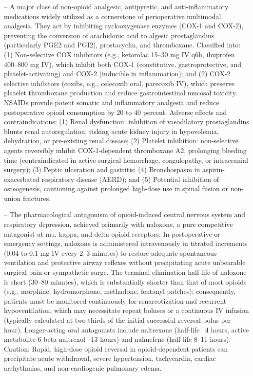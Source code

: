 -- A major class of non-opioid analgesic, antipyretic, and anti-inflammatory medications widely utilized as a cornerstone of perioperative multimodal analgesia. They act by inhibiting cyclooxygenase enzymes (COX-1 and COX-2), preventing the conversion of arachidonic acid to algesic prostaglandins (particularly PGE2 and PGI2), prostacyclin, and thromboxane. Classified into: (1) Non-selective COX inhibitors (e.g., ketorolac 15--30 mg IV q6h, ibuprofen 400--800 mg IV), which inhibit both COX-1 (constitutive, gastroprotective, and platelet-activating) and COX-2 (inducible in inflammation); and (2) COX-2 selective inhibitors (coxibs, e.g., celecoxib oral, parecoxib IV), which preserve platelet thromboxane production and reduce gastrointestinal mucosal toxicity. NSAIDs provide potent somatic and inflammatory analgesia and reduce postoperative opioid consumption by 20 to 40 percent. Adverse effects and contraindications: (1) Renal dysfunction: inhibition of vasodilatory prostaglandins blunts renal autoregulation, risking acute kidney injury in hypovolemia, dehydration, or pre-existing renal disease; (2) Platelet inhibition: non-selective agents reversibly inhibit COX-1-dependent thromboxane A2, prolonging bleeding time (contraindicated in active surgical hemorrhage, coagulopathy, or intracranial surgery); (3) Peptic ulceration and gastritis; (4) Bronchospasm in aspirin-exacerbated respiratory disease (AERD); and (5) Potential inhibition of osteogenesis, cautioning against prolonged high-dose use in spinal fusion or non-union fractures.

-- The pharmacological antagonism of opioid-induced central nervous system and respiratory depression, achieved primarily with naloxone, a pure competitive antagonist at mu, kappa, and delta opioid receptors. In postoperative or emergency settings, naloxone is administered intravenously in titrated increments (0.04 to 0.1 mg IV every 2--3 minutes) to restore adequate spontaneous ventilation and protective airway reflexes without precipitating acute unbearable surgical pain or sympathetic surge. The terminal elimination half-life of naloxone is short (30--80 minutes), which is substantially shorter than that of most opioids (e.g., morphine, hydromorphone, methadone, fentanyl patches); consequently, patients must be monitored continuously for renarcotization and recurrent hypoventilation, which may necessitate repeat boluses or a continuous IV infusion (typically calculated at two-thirds of the initial successful reversal bolus per hour). Longer-acting oral antagonists include naltrexone (half-life ~4 hours, active metabolite 6-beta-naltrexol ~13 hours) and nalmefene (half-life 8--11 hours). Caution: Rapid, high-dose opioid reversal in opioid-dependent patients can precipitate acute withdrawal, severe hypertension, tachycardia, cardiac arrhythmias, and non-cardiogenic pulmonary edema.

